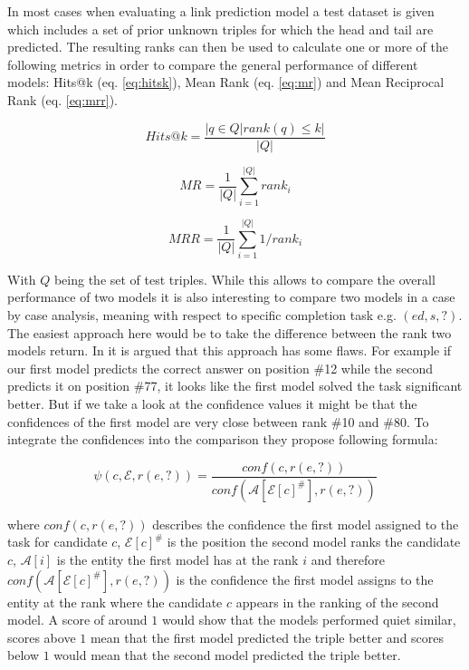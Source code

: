 In most cases when evaluating a link prediction model a test dataset is given which includes a set of prior unknown triples for which the head and tail are predicted. The resulting ranks can then be used to calculate one or more of the following metrics in order to compare the general performance of different models: Hits@k (eq. \ref{eq:hitsk}), Mean Rank (eq. \ref{eq:mr}) and Mean Reciprocal Rank (eq. \ref{eq:mrr}). 

\begin{equation}
Hits@k=\frac{|{q \in Q | rank(q) \le k}|}{|Q|}
\label{eq:hitsk}
\end{equation}

\begin{equation}
MR=\frac{1}{|Q|} \sum_{i=1}^{|Q|}{rank_i}
\label{eq:mr}
\end{equation}

\begin{equation}
MRR=\frac{1}{|Q|} \sum_{i=1}^{|Q|}{1/rank_i}
\label{eq:mrr}
\end{equation}

With $Q$ being the set of test triples. While this allows to compare the overall performance of two models it is also interesting to compare two models in a case by case analysis, meaning with respect to specific completion task e.g. $(ed,s,?)$. The easiest approach here would be to take the difference between the rank two models return. In \cite{meilicke_why_2021} it is argued that this approach has some flaws. For example if our first model predicts the correct answer on position \#12 while the second predicts it on position \#77, it looks like the first model solved the task significant better. But if we take a look at the confidence values it might be that the confidences of the first model are very close between rank \#10 and \#80. To integrate the confidences into the comparison they propose following formula: 

\begin{equation}
\psi(c,\mathcal{E},r(e,?))=\frac{conf(c, r(e,?))}{conf(\mathcal{A}[\mathcal{E}[c]^\#],r(e,?))}
\label{eq:difference_psi}
\end{equation}

where $conf(c, r(e,?))$ describes the confidence the first model assigned to the task for candidate $c$, $\mathcal{E}[c]^\#$ is the position the second model ranks the candidate $c$, $\mathcal{A}[i]$ is the entity the first model has at the rank $i$ and therefore $conf(\mathcal{A}[\mathcal{E}[c]^\#],r(e,?))$ is the confidence the first model assigns to the entity at the rank where the candidate $c$ appears in the ranking of the second model. A score of around $1$ would show that the models performed quiet similar, scores above $1$ mean that the first model predicted the triple better and scores below $1$ would mean that the second model predicted the triple better. 

